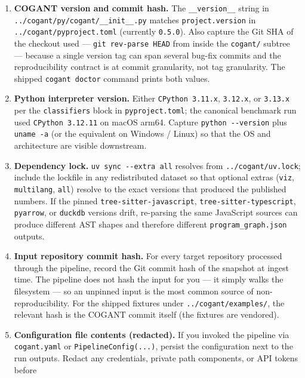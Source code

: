 \documentclass[
]{article}
\providecommand{\tightlist}{%
  \setlength{\itemsep}{0pt}\setlength{\parskip}{0pt}}
\begin{document}
\begin{enumerate}
\def\labelenumi{\arabic{enumi}.}
\tightlist
\item
  \textbf{COGANT version and commit hash.} The \texttt{\_\_version\_\_}
  string in \texttt{../cogant/py/cogant/\_\_init\_\_.py} matches
  \texttt{project.version} in \texttt{../cogant/pyproject.toml}
  (currently \texttt{0.5.0}). Also capture the Git SHA of the checkout
  used --- \texttt{git\ rev-parse\ HEAD} from inside the
  \texttt{cogant/} subtree --- because a single version tag can span
  several bug-fix commits and the reproducibility contract is at commit
  granularity, not tag granularity. The shipped \texttt{cogant\ doctor}
  command prints both values.
\item
  \textbf{Python interpreter version.} Either \texttt{CPython\ 3.11.x},
  \texttt{3.12.x}, or \texttt{3.13.x} per the \texttt{classifiers} block
  in \texttt{pyproject.toml}; the canonical benchmark run used
  \texttt{CPython\ 3.12.11} on macOS arm64. Capture
  \texttt{python\ -\/-version} plus \texttt{uname\ -a} (or the
  equivalent on Windows / Linux) so that the OS and architecture are
  visible downstream.
\item
  \textbf{Dependency lock.} \texttt{uv\ sync\ -\/-extra\ all} resolves
  from \texttt{../cogant/uv.lock}; include the lockfile in any
  redistributed dataset so that optional extras (\texttt{viz},
  \texttt{multilang}, \texttt{all}) resolve to the exact versions that
  produced the published numbers. If the pinned
  \texttt{tree-sitter-javascript}, \texttt{tree-sitter-typescript},
  \texttt{pyarrow}, or \texttt{duckdb} versions drift, re-parsing the
  same JavaScript sources can produce different AST shapes and therefore
  different \texttt{program\_graph.json} outputs.
\item
  \textbf{Input repository commit hash.} For every target repository
  processed through the pipeline, record the Git commit hash of the
  snapshot at ingest time. The pipeline does not hash the input for you
  --- it simply walks the filesystem --- so an unpinned input is the
  most common source of non-reproducibility. For the shipped fixtures
  under \texttt{../cogant/examples/}, the relevant hash is the COGANT
  commit itself (the fixtures are vendored).
\item
  \textbf{Configuration file contents (redacted).} If you invoked the
  pipeline via \texttt{cogant.yaml} or \texttt{PipelineConfig(...)},
  persist the configuration next to the run outputs. Redact any
  credentials, private path components, or API tokens before

\end{enumerate}
\end{document}
